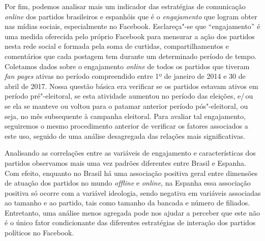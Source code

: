 Por fim, podemos analisar mais um indicador das estratégias de
comunicação \emph{online} dos partidos brasileiros e espanhóis que é o
\emph{engajamento} que logram obter nas mídias sociais, especialmente no
Facebook. Esclareça"-se que ``engajamento'' é uma medida oferecida pelo
próprio Facebook para mensurar a ação dos partidos nesta rede social e
formada pela soma de curtidas, compartilhamentos e comentários que cada
postagem tem durante um determinado período de tempo. Coletamos dados
sobre o engajamento \emph{online} de todos os partidos que tiveram \emph{fan
pages} ativas no período compreendido entre 1º de janeiro de 2014 e 30
de abril de 2017. Nossa questão básica era verificar se os partidos
estavam ativos em período pré"-eleitoral, se esta atividade aumentou no
período das eleições, e/\,ou se ela se manteve ou voltou para o patamar
anterior período pós"-eleitoral, ou seja, no mês subsequente à campanha
eleitoral. Para avaliar tal engajamento, seguiremos o mesmo procedimento
anterior de verificar os fatores associados a este uso, seguido de uma
análise desagregada das relações mais significativas.

Analisando as correlações entre as variáveis de engajamento e
características dos partidos observamos mais uma vez padrões diferentes
entre Brasil e Espanha. Com efeito, enquanto no Brasil há uma associação
positiva geral entre dimensões de atuação dos partidos no mundo \emph{offline}
e \emph{online}, na Espanha essa associação positiva só ocorre com a variável
ideologia, sendo negativa em variáveis associadas ao tamanho e ao
partido, tais como tamanho da bancada e número de filiados. Entretanto,
uma análise menos agregada pode nos ajudar a perceber que este não é o
único fator condicionante das diferentes estratégias de interação dos
partidos políticos no Facebook.

